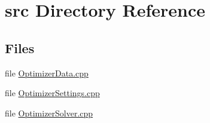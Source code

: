 \section{src Directory Reference}
\label{dir_68267d1309a1af8e8297ef4c3efbcdba}
\subsection*{Files}
\begin{DoxyCompactItemize}
\item 
file \hyperlink{OptimizerData_8cpp}{Optimizer\+Data.\+cpp}
\item 
file \hyperlink{OptimizerSettings_8cpp}{Optimizer\+Settings.\+cpp}
\item 
file \hyperlink{OptimizerSolver_8cpp}{Optimizer\+Solver.\+cpp}
\end{DoxyCompactItemize}
